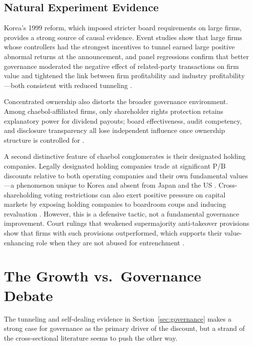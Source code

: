 \documentclass[12pt]{article}
\begin{document}
\subsection{Natural Experiment Evidence}

Korea's 1999 reform, which imposed stricter board requirements on large firms, provides a strong source of causal evidence. Event studies show that large firms whose controllers had the strongest incentives to tunnel earned large positive abnormal returns at the announcement, and panel regressions confirm that better governance moderated the negative effect of related-party transactions on firm value and tightened the link between firm profitability and industry profitability---both consistent with reduced tunneling \citep{black2015governance}.

Concentrated ownership also distorts the broader governance environment. Among chaebol-affiliated firms, only shareholder rights protection retains explanatory power for dividend payouts; board effectiveness, audit competency, and disclosure transparency all lose independent influence once ownership structure is controlled for \citep{njoku2026governance}.

A second distinctive feature of chaebol conglomerates is their designated holding companies. Legally designated holding companies trade at significant P/B discounts relative to both operating companies and their own fundamental values---a phenomenon unique to Korea and absent from Japan and the US \citep{park2019holding}. Cross-shareholding voting restrictions can also exert positive pressure on capital markets by exposing holding companies to boardroom coups and inducing revaluation \citep{park2025cross}. However, this is a defensive tactic, not a fundamental governance improvement. Court rulings that weakened supermajority anti-takeover provisions show that firms with such provisions outperformed, which supports their value-enhancing role when they are not abused for entrenchment \citep{kim2022supermajority}.

\section{The Growth vs.\ Governance Debate}
\label{sec:growth}

The tunneling and self-dealing evidence in Section~\ref{sec:governance} makes a strong case for governance as the primary driver of the discount, but a strand of the cross-sectional literature seems to push the other way.
\end{document}
